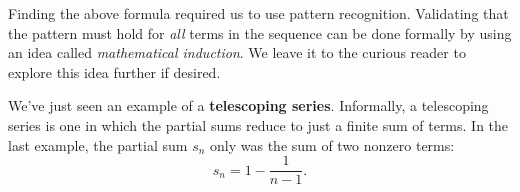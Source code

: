 \documentclass{ximera}
\begin{document}
\begin{remark}
Finding the above formula required us to use pattern recognition.  Validating that the pattern must hold for \emph{all} terms in the sequence can be done formally by using an idea called \emph{mathematical induction}.  We leave it to the curious reader to explore this idea further if desired.
\end{remark}

We've just seen an example of a \textbf{telescoping series}. Informally,
a telescoping series is one in which the partial sums reduce to just a
finite sum of terms. In the last example, the partial sum $s_n$ only was the sum of two nonzero terms: 
\[
s_n = 1 - \frac{1}{n-1}.
\]

%
\end{document}
